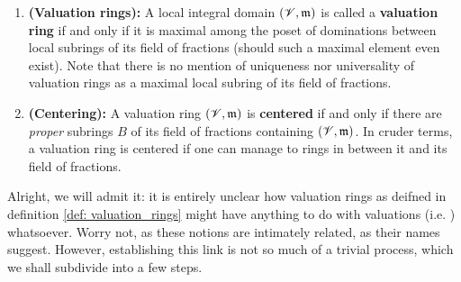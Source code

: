\begin{definition}
\begin{enumerate}
                    \item \textbf{(Valuation rings):} A local integral domain $(\mathscr{V}, \mathfrak{m})$ is called a \textbf{valuation ring} if and only if it is maximal among the poset of dominations between local subrings of its field of fractions (should such a maximal element even exist). Note that there is no mention of uniqueness nor universality of valuation rings as a maximal local subring of its field of fractions.
                    \item \textbf{(Centering):} A valuation ring $(\mathscr{V}, \mathfrak{m})$ is \textbf{centered} if and only if there are \textit{proper} subrings $B$ of its field of fractions containing $(\mathscr{V}, \mathfrak{m})$. In cruder terms, a valuation ring is centered if one can manage to  rings in between it and its field of fractions.
                \end{enumerate}
            \end{definition}
            
            Alright, we will admit it: it is entirely unclear how valuation rings as deifned in definition \ref{def: valuation_rings} might have anything to do with valuations (i.e. ) whatsoever. Worry not, as these notions are intimately related, as their names suggest. However, establishing this link is not so much of a trivial process, which we shall subdivide into a few steps.
            
